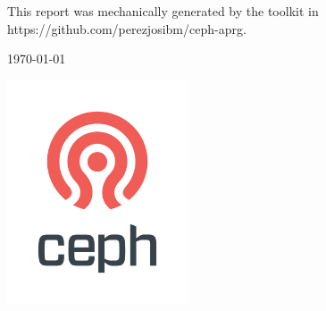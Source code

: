 \begin{titlepage}
\begin{center}
      {\small
      This report was mechanically generated by the toolkit in https://github.com/perezjosibm/ceph-aprg.}

      {\large \today}
       \vfill

       \vspace{0.8cm}
       \includegraphics[width=0.4\textwidth]{ceph_362px.png}
   \end{center}
\end{titlepage}
\tableofcontents
